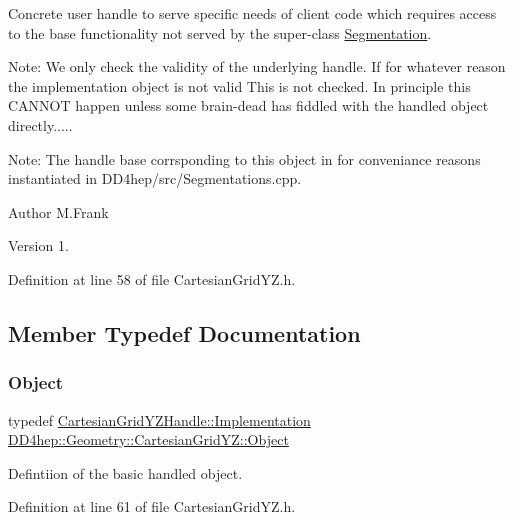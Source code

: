 Concrete user handle to serve specific needs of client code which requires access to the base functionality not served by the super-\/class \hyperlink{class_d_d4hep_1_1_geometry_1_1_segmentation}{Segmentation}.

Note\+: We only check the validity of the underlying handle. If for whatever reason the implementation object is not valid This is not checked. In principle this C\+A\+N\+N\+OT happen unless some brain-\/dead has fiddled with the handled object directly.....

Note\+: The handle base corrsponding to this object in for conveniance reasons instantiated in D\+D4hep/src/\+Segmentations.\+cpp.

\begin{DoxyAuthor}{Author}
M.\+Frank 
\end{DoxyAuthor}
\begin{DoxyVersion}{Version}
1. 
\end{DoxyVersion}


Definition at line 58 of file Cartesian\+Grid\+Y\+Z.\+h.



\subsection{Member Typedef Documentation}
\hypertarget{class_d_d4hep_1_1_geometry_1_1_cartesian_grid_y_z_ad5db30e8623d30e9f23f0c4f8e0b546e}{}\label{class_d_d4hep_1_1_geometry_1_1_cartesian_grid_y_z_ad5db30e8623d30e9f23f0c4f8e0b546e} 
\subsubsection{\texorpdfstring{Object}{Object}}
{\footnotesize\ttfamily typedef \hyperlink{class_d_d4hep_1_1_handle_ad7ff728a25806079516b8965b9113f1a}{Cartesian\+Grid\+Y\+Z\+Handle\+::\+Implementation} \hyperlink{class_d_d4hep_1_1_geometry_1_1_cartesian_grid_y_z_ad5db30e8623d30e9f23f0c4f8e0b546e}{D\+D4hep\+::\+Geometry\+::\+Cartesian\+Grid\+Y\+Z\+::\+Object}}



Defintiion of the basic handled object. 



Definition at line 61 of file Cartesian\+Grid\+Y\+Z.\+h.



